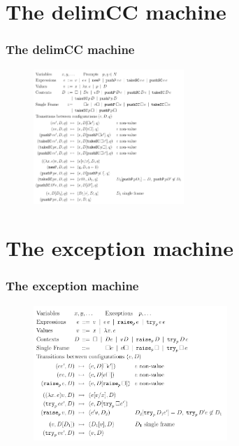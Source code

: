 \documentclass{beamer}
\begin{document}
  \section{The delimCC machine}
  \begin{frame}
    \frametitle{The delimCC machine}
    \begin{figure}[ht]
      \begin{center}        
        \includegraphics[height=2in]{pipelinefigures/DelimCCMachineSpecI.pdf}
      \end{center}      
    \end{figure}

  \end{frame}
  \section{The exception machine}
  \begin{frame}
    \frametitle{The exception machine}
    \begin{figure}[ht]
      \begin{center}        
        \includegraphics[height=2in]{pipelinefigures/ExceptionMachineSpecI.pdf}
      \end{center}      
    \end{figure}
  \end{frame}
\end{document}
